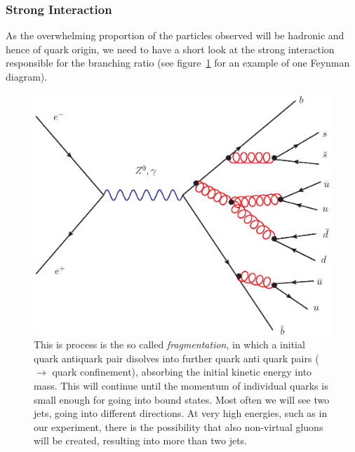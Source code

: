 \subsubsection{Strong Interaction}
\label{sub:strong}
As the overwhelming proportion of the particles observed will be hadronic and hence of quark origin, we need to have a short
look at the strong interaction responsible for the branching ratio (see figure~\ref{fig:hadrons} for an example of one 
Feynman diagram).
\begin{figure}[htpb]
    \centering
    \includegraphics[width=0.8\linewidth]{figures/hadrons}
    \caption{This is process is the so called \textit{fragmentation}, in which a initial quark antiquark pair disolves into
further quark anti quark pairs ($\rightarrow$ quark confinement), absorbing the initial kinetic energy into mass. This will
continue until the momentum of individual quarks is small enough for going into bound states. Most often we will see two
jets, going into different directions. At very high energies, such as in our experiment, there is the possibility that
also non-virtual gluons will be created, resulting into more than two jets.}
    \label{fig:hadrons}
\end{figure}

